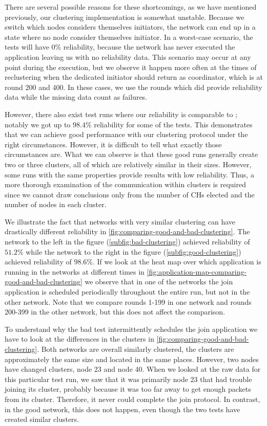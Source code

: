There are several possible reasons for these shortcomings, as we have mentioned previously, our clustering implementation is somewhat unstable. Because we switch which nodes considers themselves initiators, the network can end up in a state where no node consider themselves initiator. In a worst-case scenario, the tests will have $0\%$ reliability, because the network has never executed the application leaving us with no reliability data. This scenario may occur at any point during the execution, but we observe it happen more often at the times of reclustering when the dedicated initiator should return as coordinator, which is at round 200 and 400. In these cases, we use the rounds which did provide reliability data while the missing data count as failures.

However, there also exist test runs where our reliability is comparable to \atwo{}; notably we got up to $98.4\%$ reliability for some of the tests. This demonstrates that we can achieve good performance with our clustering protocol under the right circumstances. However, it is difficult to tell what exactly those circumstances are. What we can observe is that these good runs generally create two or three clusters, all of which are relatively similar in their sizes. However, some runs with the same properties provide results with low reliability. Thus, a more thorough examination of the communication within clusters is required since we cannot draw conclusions only from the number of CHs elected and the number of nodes in each cluster.

We illustrate the fact that networks with very similar clustering can have drastically different reliability in \cref{fig:comparing-good-and-bad-clustering}. The network to the left in the figure (\cref{subfig:bad-clustering}) achieved reliability of $51.2\%$ while the network to the right in the figure (\cref{subfig:good-clustering}) achieved reliability of $98.6\%$. If we look at the heat map over which application is running in the networks at different times in \cref{fig:application-map-comparing-good-and-bad-clustering} we observe that in one of the networks the join application is scheduled periodically throughout the entire run, but not in the other network. Note that we compare rounds 1-199 in one network and rounds 200-399 in the other network, but this does not affect the comparison.

To understand why the bad test intermittently schedules the join application we have to look at the differences in the clusters in \cref{fig:comparing-good-and-bad-clustering}. Both networks are overall similarly clustered, the clusters are approximately the same size and located in the same places. However, two nodes have changed clusters, node 23 and node 40. When we looked at the raw data for this particular test run, we saw that it was primarily node 23 that had trouble joining its cluster, probably because it was too far away to get enough packets from its cluster. Therefore, it never could complete the join protocol. In contrast, in the good network, this does not happen, even though the two tests have created similar clusters.

